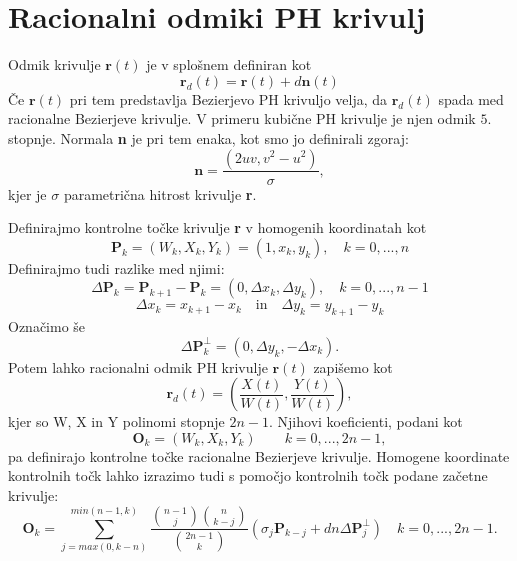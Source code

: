 \documentclass[12pt]{article}
\begin{document}
\section{Racionalni odmiki PH krivulj}
Odmik krivulje $\textbf{r}(t)$ je v splošnem definiran kot
$$\textbf{r}_d(t) = \textbf{r}(t) + d \textbf{n}(t)$$
Če $\textbf{r}(t)$ pri tem predstavlja Bezierjevo PH krivuljo velja, 
da $\textbf{r}_d(t)$ spada med racionalne Bezierjeve krivulje. V primeru kubične PH krivulje 
je njen odmik $5.$ stopnje. Normala \textbf{n} je pri tem enaka, kot smo jo definirali zgoraj:
$$\textbf{n} =\frac{(2uv, v^2 - u^2)}{\sigma},$$
kjer je $\sigma$ parametrična hitrost krivulje \textbf{r}.

Definirajmo kontrolne točke krivulje \textbf{r} v homogenih koordinatah kot
$$ \textbf{P}_k = (W_k, X_k, Y_k) = (1, x_k, y_k), \quad k = 0, ..., n$$
Definirajmo tudi razlike med njimi:
$$\Delta \textbf{P}_k = \textbf{P}_{k+1}-\textbf{P}_k = (0, \Delta x_k, \Delta y_k), \quad k = 0, ..., n-1$$ 
$$\Delta x_k = x_{k+1} - x_k \quad \text{in} \quad \Delta y_k = y_{k+1} - y_k$$
Označimo še $$ \Delta \textbf{P}_k^{\perp} = (0, \Delta y_k, - \Delta x_k).$$ 
Potem lahko racionalni odmik PH krivulje $\textbf{r}(t)$ zapišemo kot
$$ \textbf{r}_d(t) = \left(\frac{X(t)}{W(t)}, \frac{Y(t)}{W(t)}\right),$$
kjer so W, X in Y polinomi stopnje $2n -1$. Njihovi koeficienti, podani kot
$$ \textbf{O}_k = (W_k, X_k, Y_k) \quad  \quad k = 0, ..., 2n-1,$$
pa definirajo kontrolne točke racionalne Bezierjeve krivulje. 
Homogene koordinate kontrolnih točk lahko izrazimo tudi s pomočjo kontrolnih točk podane začetne krivulje:
$$ \textbf{O}_k = \sum_{j=max(0,k-n)}^{min(n-1,k)}{\frac{\binom{n-1}{j}\binom{n}{k-j}}{\binom{2n-1}{k}}(\sigma_j \textbf{P}_{k-j}+d n \Delta \textbf{P}^{\perp}_{j})} \quad k = 0, ..., 2n-1.$$
\end{document}
